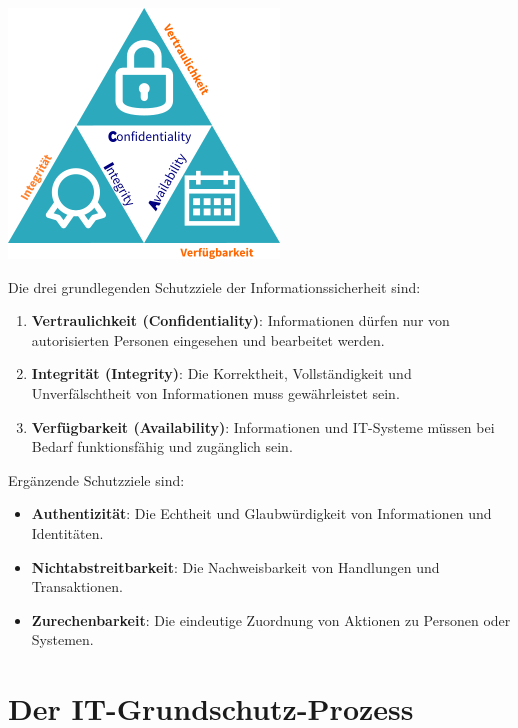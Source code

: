 \documentclass{orgstandard}
\begin{document}
\begin{center}
\includegraphics[width=.4\linewidth]{img/CIA.png}
\end{center}

Die drei grundlegenden Schutzziele der Informationssicherheit sind:
\begin{tolearn}
\begin{enumerate}
\item \textbf{Vertraulichkeit (Confidentiality)}: Informationen dürfen nur von autorisierten Personen eingesehen und bearbeitet werden.
\item \textbf{Integrität (Integrity)}: Die Korrektheit, Vollständigkeit und Unverfälschtheit von Informationen muss gewährleistet sein.
\item \textbf{Verfügbarkeit (Availability)}: Informationen und IT-Systeme müssen bei Bedarf funktionsfähig und zugänglich sein.
\end{enumerate}
\end{tolearn}
Ergänzende Schutzziele sind:
\begin{tolearn}
\begin{itemize}
\item \textbf{Authentizität}: Die Echtheit und Glaubwürdigkeit von Informationen und Identitäten.
\item \textbf{Nichtabstreitbarkeit}: Die Nachweisbarkeit von Handlungen und Transaktionen.
\item \textbf{Zurechenbarkeit}: Die eindeutige Zuordnung von Aktionen zu Personen oder Systemen.
\end{itemize}
\end{tolearn}
\section{Der IT-Grundschutz-Prozess}
\label{sec:org33f336b}
\end{document}
